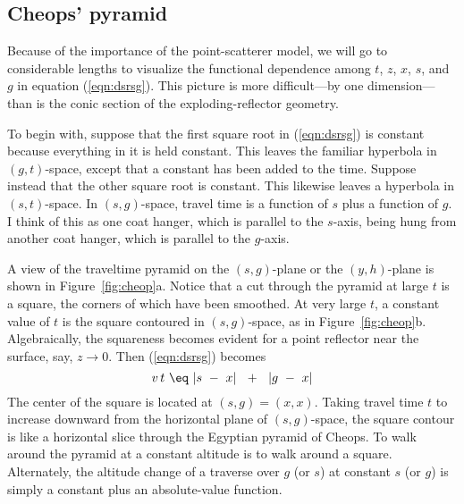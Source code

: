 \subsection{Cheops' pyramid}
\par
Because of the importance of the point-scatterer model,
we will go to considerable lengths to visualize the functional dependence
among $t$, $z$, $x$, $s$, and $g$ in equation (\ref{eqn:dsrsg}).
This picture is more difficult---by one dimension---than is
the conic section of the exploding-reflector geometry.
\par
To begin with,
suppose that the first square root in (\ref{eqn:dsrsg}) is constant
because everything in it is held constant.
This leaves the familiar hyperbola in  $(g,t)$-space,
except that a constant has been added to the time.
Suppose instead that the other square root is constant.
This likewise leaves a hyperbola in  $(s,t)$-space.
In  $(s,g)$-space, travel time is a function of  $s$  plus a function of  $g$.
I think of this as one coat hanger, which is 
parallel to the $s$-axis, being hung from another coat hanger,
which is parallel to the $g$-axis.
\par
A view of the traveltime pyramid on the  $(s,g)$-plane
or the  $(y,h)$-plane is shown in Figure~\ref{fig:cheop}a.
Notice that a cut through the pyramid at
large  $t$  is a square, the corners of which have been smoothed.
At very large  $t$,
a constant value of  $t$  is the square contoured in  $(s,g)$-space,
as in Figure~\ref{fig:cheop}b.
Algebraically, the squareness becomes evident for a point reflector
near the surface, say,  $z  \to  0$.
Then (\ref{eqn:dsrsg}) becomes
\begin{equation}
v\,t\  \eq \ | s \ -\  x |\ \ +\ \ | g \ -\  x |
\label{eqn:2.4}
\end{equation}
The center of the square is located at  $(s,g) = (x,x)$.
Taking travel time  $t$  to increase downward
from the horizontal plane of  $(s,g)$-space,
the square contour is like a horizontal slice through the Egyptian pyramid
of Cheops.
To walk around the pyramid at a constant altitude 
is to walk around a square.
Alternately,
the altitude change of a traverse over
$g$  (or $s$) at constant
$s$  (or $g$) is simply a constant plus an absolute-value function.
